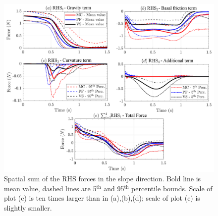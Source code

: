 \documentclass{article}
\begin{document}
\begin{figure}[H]
        \centering
        \includegraphics[width=1\textwidth]{InclinedPlane/AveragedMeasurments/ForcesIncline.png}
        \caption{Spatial sum of the RHS forces in the slope direction. Bold line is mean value, dashed lines are 5$^{\mathrm{th}}$ and 95$^{\mathrm{th}}$ percentile bounds. Scale of plot (c) is ten times larger than in (a),(b),(d); scale of plot (e) is slightly smaller.}
        \label{fig:Ramp-Fx-spatial}
\end{figure}
\newpage
\end{document}
